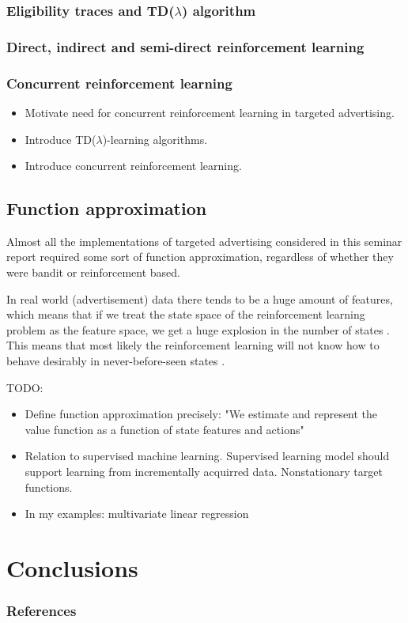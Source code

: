 \documentclass{article} %
\begin{document}
\subsubsection{Eligibility traces and TD($\lambda$) algorithm}


\subsubsection{Direct, indirect and semi-direct reinforcement learning}

\subsubsection{Concurrent reinforcement learning}

\begin{itemize}
  \item{Motivate need for concurrent reinforcement learning in targeted
    advertising.}
  \item{Introduce TD($\lambda$)-learning algorithms.}
  \item{Introduce concurrent reinforcement learning.}
\end{itemize}


\subsection{Function approximation}
\label{sec:function_approximation}
Almost all the implementations \cite{abe2002empirical, silver2013concurrent,
chapelle2011empirical} of targeted advertising considered in this seminar
report required some sort of function approximation, regardless of whether they
were bandit or reinforcement based.

In real world (advertisement) data there tends to be a huge amount of features,
which means that if we treat the state space of the reinforcement learning
problem as the feature space, we get a huge explosion in the number of states
\cite{abe2002empirical}.  This means that most likely the reinforcement
learning will not know how to behave desirably in never-before-seen states
\cite{book}.

TODO:
\begin{itemize}
  \item{Define function approximation precisely: "We estimate and represent the
    value function as a function of state features and actions"}
  \item{Relation to supervised machine learning. Supervised learning model
    should support learning from incrementally acquirred data. Nonstationary
  target functions.}
  \item{In my examples: multivariate linear regression}
\end{itemize}


\section{Conclusions}

\subsubsection*{References}

\printbibliography[heading=none]
\end{document}
